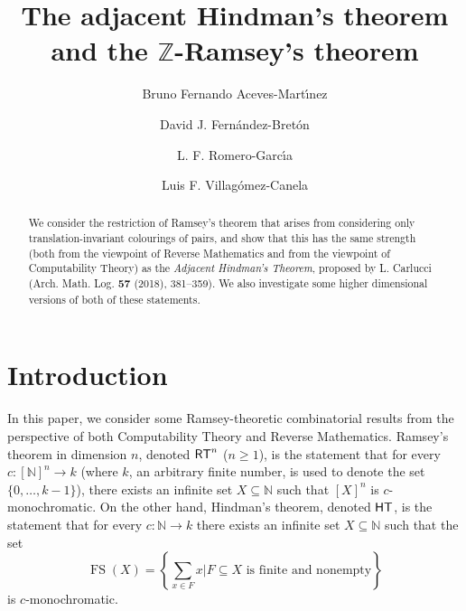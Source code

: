 \documentclass[11pt]{amsart}
\author[B. Aceves]{Bruno Fernando Aceves-Mart\'{\i}nez}
\author[D. Fern\'andez]{David J. Fern\'andez-Bret\'on}
\author[L. Romero]{L. F. Romero-Garc\'{\i}a}
\author[L. Villag\'omez]{Luis F. Villag\'omez-Canela}
\title[Adjacent Hindman's and $\mathbb Z$-Ramsey's]{The adjacent Hindman's theorem and the $\mathbb Z$-Ramsey's theorem}
\newcommand{\rt}{\mathnormal{\mathsf{RT}}}
\newcommand{\hind}{\mathnormal{\mathsf{HT}}}
\DeclareMathOperator{\fs}{FS}
\theoremstyle{definition}
\begin{document}
\begin{abstract}
We consider the restriction of Ramsey's theorem that arises from considering only translation-invariant colourings of pairs, and show that this has the same strength (both from the viewpoint of Reverse Mathematics and from the viewpoint of Computability Theory) as the {\em Adjacent Hindman's Theorem}, proposed by L. Carlucci (Arch. Math. Log. {\bf 57} (2018), 381--359). We also investigate some higher dimensional versions of both of these statements.
\end{abstract}

\maketitle

\section{Introduction}

In this paper, we consider some Ramsey-theoretic combinatorial results from the perspective of both Computability Theory and Reverse Mathematics. Ramsey's theorem in dimension $n$, denoted $\rt^n$ ($n\geq 1$), is the statement that for every $c:[\mathbb N]^n\longrightarrow k$ (where $k$, an arbitrary finite number, is used to denote the set $\{0,\ldots,k-1\}$), there exists an infinite set $X\subseteq\mathbb N$ such that $[X]^n$ is $c$-monochromatic. On the other hand, Hindman's theorem, denoted $\hind$, is the statement that for every $c:\mathbb N\longrightarrow k$ there exists an infinite set $X\subseteq\mathbb N$ such that the set
\begin{equation*}
\fs(X)=\left\{\sum_{x\in F}x\bigg|F\subseteq X\text{ is finite and nonempty}\right\}
\end{equation*}
is $c$-monochromatic.
\end{document}
